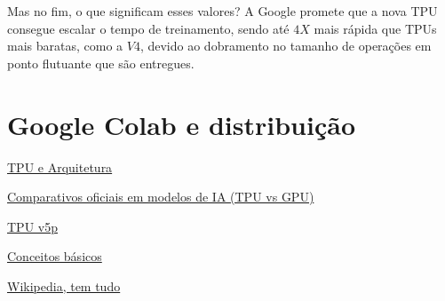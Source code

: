 \documentclass{report}
\begin{document}
Mas no fim, o que significam esses valores? A Google promete que a nova TPU consegue escalar o tempo de treinamento, sendo até $4X$ mais rápida que TPUs mais baratas, como a $V4$, devido ao dobramento no tamanho de operações em ponto flutuante que são entregues.

\chapter{Google Colab e distribuição}




\href{https://www.run.ai/guides/cloud-deep-learning/google-tpu}{TPU e Arquitetura}

\href{https://cloud.google.com/blog/products/compute/performance-per-dollar-of-gpus-and-tpus-for-ai-inference}{Comparativos oficiais em modelos de IA (TPU vs GPU)}

\href{https://canaltech.com.br/inteligencia-artificial/cloud-tpu-v5p-e-o-novo-e-mais-poderoso-acelerador-de-ia-do-google-272299/}{TPU v5p}

\href{https://cloud.google.com/tpu?hl=pt-BR}{Conceitos básicos}

\href{https://en.wikipedia.org/wiki/Tensor_Processing_Unit}{Wikipedia, tem tudo}
\end{document}
